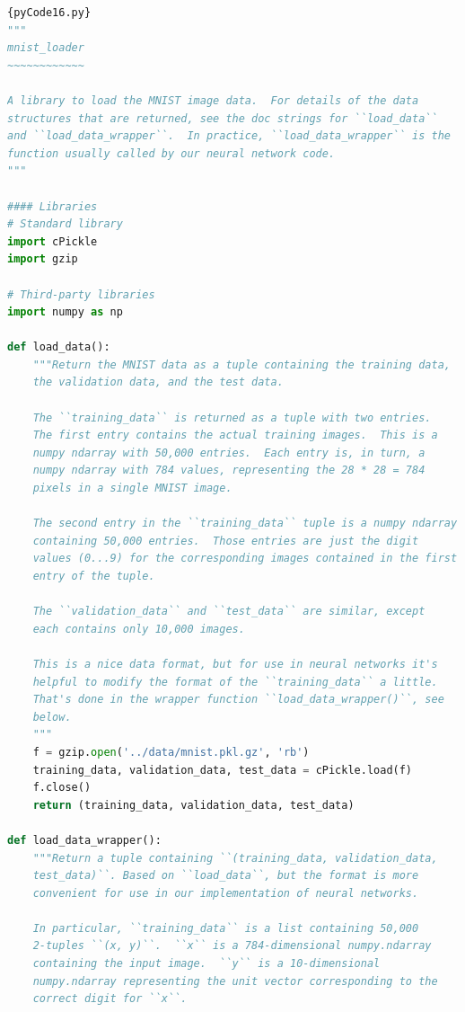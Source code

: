 \documentclass[a4paper,12pt]{report}%
\begin{document}
\begin{lstlisting}[language=Python,breaklines,basicstyle=\footnotesize\ttfamily]{pyCode16.py}
"""
mnist_loader
~~~~~~~~~~~~

A library to load the MNIST image data.  For details of the data
structures that are returned, see the doc strings for ``load_data``
and ``load_data_wrapper``.  In practice, ``load_data_wrapper`` is the
function usually called by our neural network code.
"""

#### Libraries
# Standard library
import cPickle
import gzip

# Third-party libraries
import numpy as np

def load_data():
    """Return the MNIST data as a tuple containing the training data,
    the validation data, and the test data.

    The ``training_data`` is returned as a tuple with two entries.
    The first entry contains the actual training images.  This is a
    numpy ndarray with 50,000 entries.  Each entry is, in turn, a
    numpy ndarray with 784 values, representing the 28 * 28 = 784
    pixels in a single MNIST image.

    The second entry in the ``training_data`` tuple is a numpy ndarray
    containing 50,000 entries.  Those entries are just the digit
    values (0...9) for the corresponding images contained in the first
    entry of the tuple.

    The ``validation_data`` and ``test_data`` are similar, except
    each contains only 10,000 images.

    This is a nice data format, but for use in neural networks it's
    helpful to modify the format of the ``training_data`` a little.
    That's done in the wrapper function ``load_data_wrapper()``, see
    below.
    """
    f = gzip.open('../data/mnist.pkl.gz', 'rb')
    training_data, validation_data, test_data = cPickle.load(f)
    f.close()
    return (training_data, validation_data, test_data)

def load_data_wrapper():
    """Return a tuple containing ``(training_data, validation_data,
    test_data)``. Based on ``load_data``, but the format is more
    convenient for use in our implementation of neural networks.

    In particular, ``training_data`` is a list containing 50,000
    2-tuples ``(x, y)``.  ``x`` is a 784-dimensional numpy.ndarray
    containing the input image.  ``y`` is a 10-dimensional
    numpy.ndarray representing the unit vector corresponding to the
    correct digit for ``x``.


\end{lstlisting}
\end{document}
